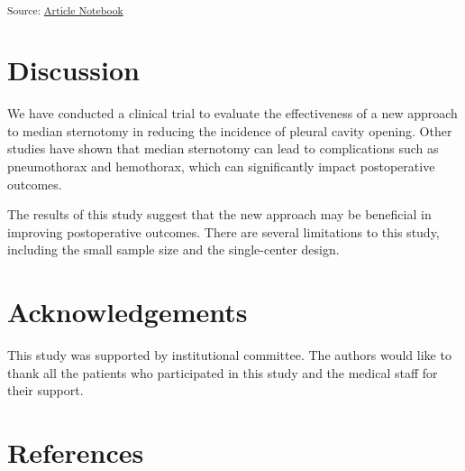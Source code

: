 \documentclass[
  number]{elsarticle}
\begin{document}
\textsubscript{Source:
\href{https://raffdoc.github.io/manuscript-template/index.qmd.html}{Article
Notebook}}

\section{Discussion}\label{discussion}

We have conducted a clinical trial to evaluate the effectiveness of a
new approach to median sternotomy in reducing the incidence of pleural
cavity opening. Other studies have shown that median sternotomy can lead
to complications such as pneumothorax and hemothorax, which can
significantly impact postoperative outcomes\citep{gullu2009}.

The results of this study suggest that the new approach may be
beneficial in improving postoperative outcomes. There are several
limitations to this study, including the small sample size and the
single-center design.

\section{Acknowledgements}\label{acknowledgements}

This study was supported by institutional committee. The authors would
like to thank all the patients who participated in this study and the
medical staff for their support.

\section*{References}\label{references}




\end{document}
